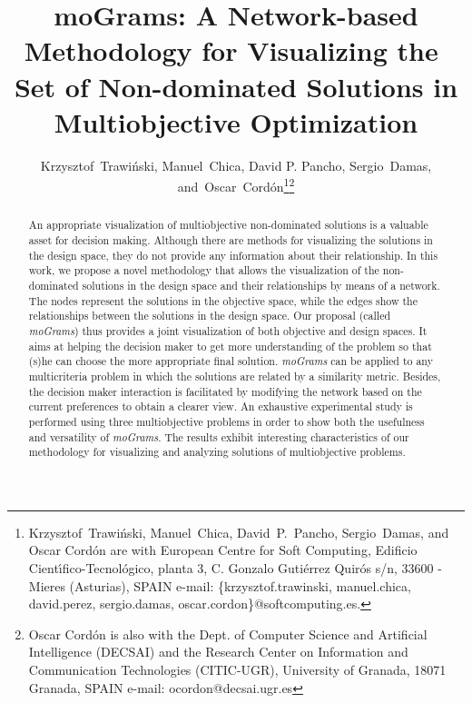 \documentclass[journal]{IEEEtran}
\begin{document}
\title{moGrams: A Network-based Methodology for Visualizing the ​​Set of Non-dominated Solutions ​in Multiobjective Optimization}


\author{Krzysztof~Trawi\'nski,
	Manuel~Chica,
	David P. Pancho,
	Sergio~Damas, and~Oscar~Cord\'on\thanks{Krzysztof~Trawi\'nski, Manuel~Chica, David~P.~Pancho, Sergio~Damas, and Oscar Cord\'on are with European Centre for Soft Computing, 
Edificio Cient\'{\i}fico-Tecnol\'ogico, planta 3, C. Gonzalo Guti\'errez Quir\'os s/n,
33600 - Mieres (Asturias), SPAIN
e-mail: \{krzysztof.trawinski, manuel.chica, david.perez, sergio.damas, oscar.cordon\}@softcomputing.es.}\thanks{Oscar Cord\'on is also with the Dept. of Computer Science and Artificial Intelligence (DECSAI) and
the Research Center on Information and Communication Technologies (CITIC-UGR),
University of Granada, 18071 Granada, SPAIN
e-mail: ocordon@decsai.ugr.es}}








\maketitle

\begin{abstract}
An appropriate visualization of multiobjective non-dominated solutions is a valuable asset for decision making. Although there are methods for visualizing the solutions in the design space, they do not provide any information about their relationship. In this work, we propose a novel methodology that allows the visualization of the non-dominated solutions in the design space and their relationships by means of a network. The nodes represent the solutions in the objective space, while the edges show the relationships between the solutions in the design space. Our proposal (called \emph{moGrams}) thus provides a joint visualization of both objective and design spaces. It aims at helping the decision maker to get more understanding of the problem so that (s)he can choose the more appropriate final solution. \emph{moGrams} can be applied to any multicriteria problem in which the solutions are related by a similarity metric. Besides, the decision maker interaction is facilitated by modifying the network based on the current preferences to obtain a clearer view. An exhaustive experimental study is performed using three multiobjective problems in order to show both the usefulness and versatility of \emph{moGrams}. The results exhibit interesting characteristics of our methodology for visualizing and analyzing solutions of multiobjective problems.
\end{abstract}
\end{document}
